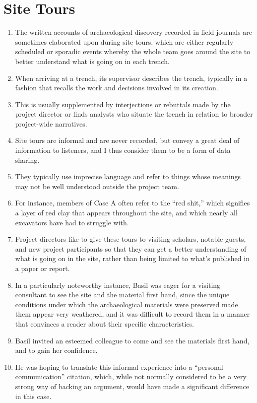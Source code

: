 \documentclass{article}
\begin{document}
\section{Site Tours}
\begin{enumerate}
  \item The written accounts of archaeological discovery recorded in field journals are sometimes elaborated upon during site tours, which are either regularly scheduled or sporadic events whereby the whole team goes around the site to better understand what is going on in each trench.
  \item When arriving at a trench, its supervisor describes the trench, typically in a fashion that recalls the work and decisions involved in its creation.
  \item This is usually supplemented by interjections or rebuttals made by the project director or finds analysts who situate the trench in relation to broader project-wide narratives.
  \item Site tours are informal and are never recorded, but convey a great deal of information to listeners, and I thus consider them to be a form of data sharing.
  \item They typically use imprecise language and refer to things whose meanings may not be well understood outside the project team.
  \item For instance, members of Case A often refer to the ``red shit,'' which signifies a layer of red clay that appears throughout the site, and which nearly all excavators have had to struggle with.
  \item Project directors like to give these tours to visiting scholars, notable guests, and new project participants so that they can get a better understanding of what is going on in the site, rather than being limited to what's published in a paper or report.
  \item In a particularly noteworthy instance, Basil was eager for a visiting consultant to see the site and the material first hand, since the unique conditions under which the archaeological materials were preserved made them appear very weathered, and it was difficult to record them in a manner that convinces a reader about their specific characteristics.
  \item Basil invited an esteemed colleague to come and see the materials first hand, and to gain her confidence.
  \item He was hoping to translate this informal experience into a ``personal communication'' citation, which, while not normally considered to be a very strong way of backing an argument, would have made a significant difference in this case.

\end{enumerate}
\end{document}
